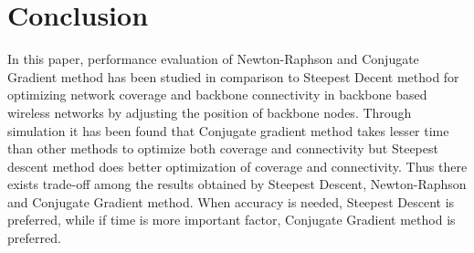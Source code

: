 \documentclass[11pt]{article}
\numberwithin{equation}{section}
\begin{document}
\newpage
\section{Conclusion}
In this paper, performance evaluation of Newton-Raphson and Conjugate Gradient method has been studied in comparison to Steepest Decent method for optimizing network coverage and backbone connectivity in backbone based wireless networks by adjusting the position of backbone nodes. Through simulation it has been found that Conjugate gradient method takes lesser time than other methods to optimize both coverage and connectivity but Steepest descent method does better optimization of coverage and connectivity. Thus there exists trade-off among the results obtained by Steepest Descent, Newton-Raphson and Conjugate Gradient method. When accuracy is needed, Steepest Descent is preferred, while if time is more important factor, Conjugate Gradient method is preferred.\\
\end{document}
